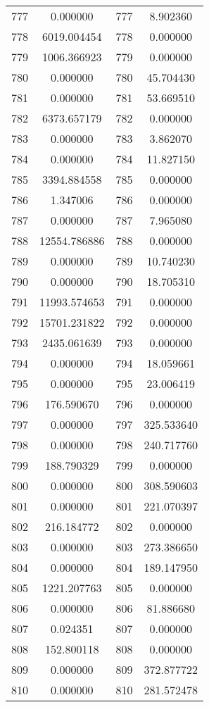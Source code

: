 \documentclass[12pt]{article}
\begin{document}
\begin{longtable}{@{}cccc@{}}
777 & 0.000000 & 777 & 8.902360 \\
778 & 6019.004454 & 778 & 0.000000 \\
779 & 1006.366923 & 779 & 0.000000 \\
780 & 0.000000 & 780 & 45.704430 \\
781 & 0.000000 & 781 & 53.669510 \\
782 & 6373.657179 & 782 & 0.000000 \\
783 & 0.000000 & 783 & 3.862070 \\
784 & 0.000000 & 784 & 11.827150 \\
785 & 3394.884558 & 785 & 0.000000 \\
786 & 1.347006 & 786 & 0.000000 \\
787 & 0.000000 & 787 & 7.965080 \\
788 & 12554.786886 & 788 & 0.000000 \\
789 & 0.000000 & 789 & 10.740230 \\
790 & 0.000000 & 790 & 18.705310 \\
791 & 11993.574653 & 791 & 0.000000 \\
792 & 15701.231822 & 792 & 0.000000 \\
793 & 2435.061639 & 793 & 0.000000 \\
794 & 0.000000 & 794 & 18.059661 \\
795 & 0.000000 & 795 & 23.006419 \\
796 & 176.590670 & 796 & 0.000000 \\
797 & 0.000000 & 797 & 325.533640 \\
798 & 0.000000 & 798 & 240.717760 \\
799 & 188.790329 & 799 & 0.000000 \\
800 & 0.000000 & 800 & 308.590603 \\
801 & 0.000000 & 801 & 221.070397 \\
802 & 216.184772 & 802 & 0.000000 \\
803 & 0.000000 & 803 & 273.386650 \\
804 & 0.000000 & 804 & 189.147950 \\
805 & 1221.207763 & 805 & 0.000000 \\
806 & 0.000000 & 806 & 81.886680 \\
807 & 0.024351 & 807 & 0.000000 \\
808 & 152.800118 & 808 & 0.000000 \\
809 & 0.000000 & 809 & 372.877722 \\
810 & 0.000000 & 810 & 281.572478 \\

\end{longtable}
\end{document}
